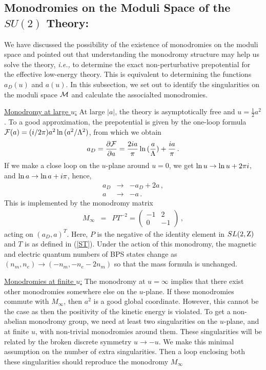 \subsection{Monodromies on the Moduli Space of the $SU(2)$ Theory:}

We have discussed the possibility of the existence of monodromies on
the moduli space and pointed out that understanding the monodromy
structure may help us solve the theory, {\it i.e.,} to determine the
exact non-perturbative prepotential for the effective low-energy
theory. This is equivalent to determining the functions $a_D(u)$ and
$a(u)$. In this subsection, we set out to identify the singularities
on the moduli space ${\cal M}$ and calculate the associalted
monodromies.  

\noindent\underline{Monodromy at large $u$:} 
At large $|a|$, the theory is asymptotically free and
$u=\frac{1}{2}a^2$. To a good approximation, the prepotential is given
by the one-loop formula ${\cal F}(a)=(i/2\pi)a^2\,{\rm ln}\,
(a^2/\Lambda^2)$, from which we obtain 
$$
a_D=\frac{\partial{\cal F}}{\partial a}=
\frac{2ia}{\pi}\,{\rm ln}\,(\frac{a}{\Lambda})+\frac{ia}{\pi}\,.
$$
If we make a close loop on the $u$-plane around $u=0$, we get 
${\rm ln}\,u \rightarrow {\rm ln}\,u+2\pi i$, and ${\rm ln}\,a
\rightarrow {\rm ln}\,a+i\pi$, hence, 
$$
\begin{array}{rcl}
a_D & \rightarrow & - a_D + 2a \,,\\
a & \rightarrow & - a \,.
\end{array}
$$
This is implemented by the monodromy matrix
\begin{eqnarray}
M_{\infty}&=& PT^{-2}=\left(\begin{array}{cc}
-1 & 2 \\ 0 & -1 \end{array} \right )\,,
\label{mondone}
\end{eqnarray}
acting on $(a_D, a)^T$.  Here, $P$ is the negative of the identity
element in $SL(2,{\rm Z})$ and $T$ is as defined in (\ref{ST}). Under
the action of this monodromy, the magnetic and electric quantum
numbers of BPS states change as $(n_m,n_e)\rightarrow
(-n_m,-n_e-2n_m)$ so that the mass formula is unchanged.

\noindent\underline{Monodromies at finite $u$:}
The monodromy at $u=\infty$ implies that there exist other monodromies
somewhere else on the $u$-plane. If these monodromies commute with
$M_\infty$, then $a^2$ is a good global coordinate. However, this
cannot be the case as then the positivity of the kinetic energy is
violated. To get a non-abelian monodromy group, we need at least two
singularities on the $u$-plane, and at finite $u$, with non-trivial
monodromies around them. These singularities will be related by the
broken discrete symmetry $u\rightarrow -u$. We make this minimal
assumption on the number of extra singularities. Then a loop enclosing
both these singularities should reproduce the monodromy $M_\infty$

